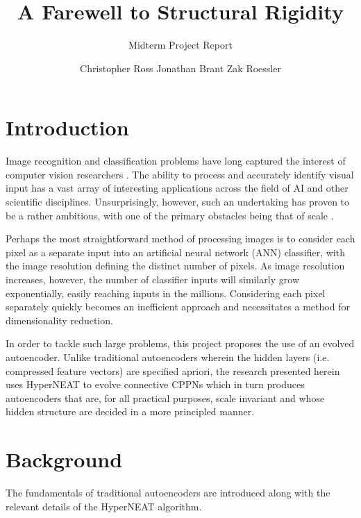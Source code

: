 \documentclass{acm_proc_article-sp}
\begin{document}
\title{A Farewell to Structural Rigidity}
\subtitle{Midterm Project Report}

\author{
\alignauthor Christopher Ross	
\alignauthor Jonathan Brant
\alignauthor Zak Roessler
}

\maketitle

\section{Introduction}
Image recognition and classification problems have long captured the interest of computer vision researchers \cite{shapiro2001computer, morris2004computer, sonka2008image}.  The ability to process and accurately identify visual input has a vast array of interesting applications across the field of AI and other scientific disciplines.  Unsurprisingly, however, such an undertaking has proven to be a rather ambitious, with one of the primary obstacles being that of scale \cite{DBLP:journals/corr/RussakovskyDSKSMHKKBBF14}.

Perhaps the most straightforward method of processing images is to consider each pixel as a separate input into an artificial neural network (ANN) classifier, with the image resolution defining the distinct number of pixels.  As image resolution increases, however, the number of classifier inputs will similarly grow exponentially, easily reaching inputs in the millions.  Considering each pixel separately quickly becomes an inefficient approach and necessitates a method for dimensionality reduction.

In order to tackle such large problems, this project proposes the use of an evolved autoencoder. Unlike traditional autoencoders wherein the hidden layers (i.e. compressed feature vectors) are specified apriori, the research presented herein uses HyperNEAT to evolve connective CPPNs which in turn produces autoencoders that are, for all practical purposes, scale invariant and whose hidden structure are decided in a more principled manner.


\section{Background}
The fundamentals of traditional autoencoders are introduced along with the relevant details of the HyperNEAT algorithm.
\end{document}
